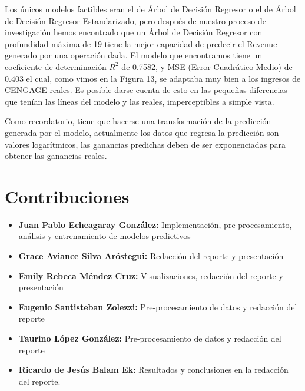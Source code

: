 \documentclass{article}
\begin{document}
        Los únicos modelos factibles eran el de Árbol de Decisión Regresor o el de Árbol de Decisión Regresor Estandarizado, pero después de nuestro proceso de investigación hemos encontrado que un Árbol de Decisión Regresor con profundidad máxima de 19 tiene la mejor capacidad de predecir el Revenue generado por una operación dada. El modelo que encontramos tiene un coeficiente de determinación $R^{2}$ de 0.7582, y MSE (Error Cuadrático Medio) de 0.403 el cual, como vimos en la Figura 13, se adaptaba muy bien a los ingresos de CENGAGE reales. Es posible darse cuenta de esto en las pequeñas diferencias que tenían las líneas del modelo y las reales, imperceptibles a simple vista.
        
        Como recordatorio, tiene que hacerse una transformación de la predicción generada por el modelo, actualmente los datos que regresa la predicción son valores logarítmicos, las ganancias predichas deben de ser exponenciadas para obtener las ganancias reales.

    \section{Contribuciones}
        \begin{itemize}
            \item \textbf{Juan Pablo Echeagaray González:} Implementación, pre-procesamiento, análisis y entrenamiento de modelos predictivos
            \item \textbf{Grace Aviance Silva Aróstegui:} Redacción del reporte y presentación
            \item \textbf{Emily Rebeca Méndez Cruz:} Visualizaciones, redacción del reporte y presentación
            \item \textbf{Eugenio Santisteban Zolezzi:} Pre-procesamiento de datos y redacción del reporte
            \item \textbf{Taurino López González:} Pre-procesamiento de datos y redacción del reporte
            \item \textbf{Ricardo de Jesús Balam Ek:} Resultados y  conclusiones en la redacción del reporte.
        \end{itemize}

        

    \clearpage
    \nocite{*}
    \printbibliography
\end{document}
